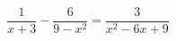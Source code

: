 \begin{ex}
	\begin{condition}
		\( \dfrac{1}{x+3}-\dfrac{6}{9-x^2}=\dfrac{3}{x^2-6x+9} \)
	\end{condition}
\end{ex}